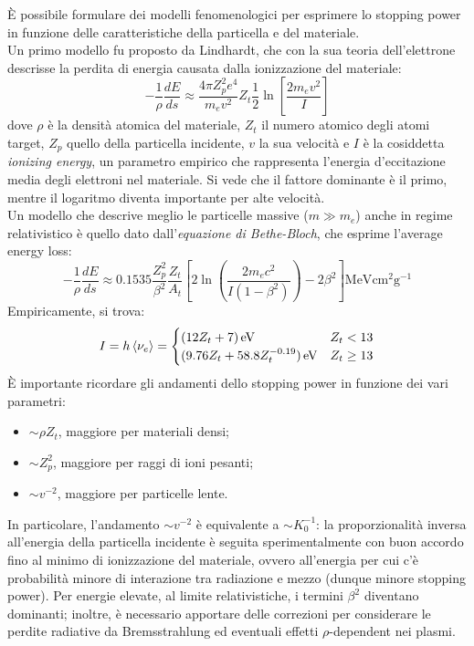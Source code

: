È possibile formulare dei modelli fenomenologici per esprimere lo stopping power in funzione delle caratteristiche della particella e del materiale.\\
Un primo modello fu proposto da Lindhardt, che con la sua teoria dell'elettrone descrisse la perdita di energia causata dalla ionizzazione del materiale:
\begin{equation}
	- \frac{1}{\rho} \frac{dE}{ds} \approx \frac{4\pi Z_p^2 e^4}{m_e v^2} Z_t \frac{1}{2} \ln \left[ \frac{2m_e v^2}{I} \right]
	\label{eq:3.4}
\end{equation}
dove $ \rho $ è la densità atomica del materiale, $ Z_t $ il numero atomico degli atomi target, $ Z_p $ quello della particella incidente, $ v $ la sua velocità e $ I $ è la cosiddetta \textit{ionizing energy}, un parametro empirico che rappresenta l'energia d'eccitazione media degli elettroni nel materiale. Si vede che il fattore dominante è il primo, mentre il logaritmo diventa importante per alte velocità.\\
Un modello che descrive meglio le particelle massive ($ m \gg m_e $) anche in regime relativistico è quello dato dall'\textit{equazione di Bethe-Bloch}, che esprime l'average energy loss:
\begin{equation}
	-\frac{1}{\rho} \frac{dE}{ds} \approx 0.1535 \frac{Z_p^2}{\beta^2} \frac{Z_t}{A_t} \left[ 2 \ln \left( \frac{2m_e c^2}{I (1 - \beta^2)} \right) - 2\beta^2 \right] \text{MeV} \text{cm}^2 \text{g}^{-1}
	\label{eq:3.5}
\end{equation}
Empiricamente, si trova:
\begin{equation}
	I = h \braket{\nu_e} =
	\begin{cases}
		(12 Z_t + 7) \,\mathrm{eV} & Z_t < 13 \\
		(9.76 Z_t + 58.8 Z_t^{-0.19}) \,\mathrm{eV} & Z_t \ge 13
	\end{cases}
	\label{eq:3.6}
\end{equation}
È importante ricordare gli andamenti dello stopping power in funzione dei vari parametri:
\begin{itemize}
	\item $ \sim \rho Z_t $, maggiore per materiali densi;
	\item $ \sim Z_p^2 $, maggiore per raggi di ioni pesanti;
	\item $ \sim v^{-2} $, maggiore per particelle lente.
\end{itemize}
In particolare, l'andamento $ \sim v^{-2} $ è equivalente a $ \sim K_0^{-1} $: la proporzionalità inversa all'energia della particella incidente è seguita sperimentalmente con buon accordo fino al minimo di ionizzazione del materiale, ovvero all'energia per cui c'è probabilità minore di interazione tra radiazione e mezzo (dunque minore stopping power). Per energie elevate, al limite relativistiche, i termini $ \beta^2 $ diventano dominanti; inoltre, è necessario apportare delle correzioni per considerare le perdite radiative da Bremsstrahlung ed eventuali effetti $ \rho $-dependent nei plasmi.\\
